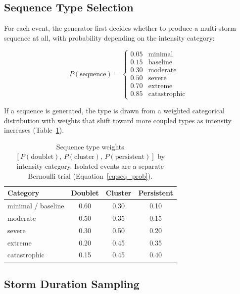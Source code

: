 \documentclass[11pt,a4paper]{article}
\begin{document}
\subsection{Sequence Type Selection}

For each event, the generator first decides whether to produce a multi-storm sequence
at all, with probability depending on the intensity category:

\begin{equation}
  P(\text{sequence}) =
  \begin{cases}
    0.05 & \text{minimal} \\
    0.15 & \text{baseline} \\
    0.30 & \text{moderate} \\
    0.50 & \text{severe} \\
    0.70 & \text{extreme} \\
    0.85 & \text{catastrophic}
  \end{cases}
  \label{eq:seq_prob}
\end{equation}

\noindent If a sequence is generated, the type is drawn from a weighted categorical
distribution with weights that shift toward more coupled types as intensity increases
(Table~\ref{tab:type_weights}).

\begin{table}[H]
  \centering
  \caption{Sequence type weights $[P(\text{doublet}),\,P(\text{cluster}),\,P(\text{persistent})]$
           by intensity category. Isolated events are a separate Bernoulli trial
           (Equation~\ref{eq:seq_prob}).}
  \label{tab:type_weights}
  \begin{tabular}{lccc}
    \toprule
    \textbf{Category} & \textbf{Doublet} & \textbf{Cluster} & \textbf{Persistent} \\
    \midrule
    minimal / baseline & 0.60 & 0.30 & 0.10 \\
    moderate           & 0.50 & 0.35 & 0.15 \\
    severe             & 0.30 & 0.50 & 0.20 \\
    extreme            & 0.20 & 0.45 & 0.35 \\
    catastrophic       & 0.15 & 0.45 & 0.40 \\
    \bottomrule
  \end{tabular}
\end{table}

\subsection{Storm Duration Sampling}
\label{sec:duration}
\end{document}
